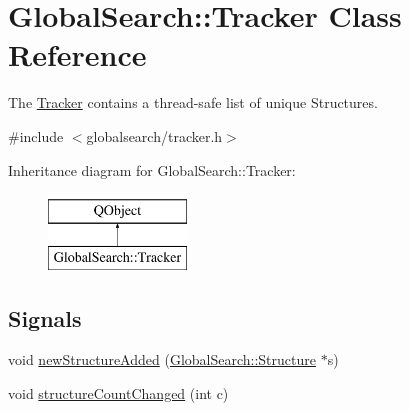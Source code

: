 \hypertarget{classGlobalSearch_1_1Tracker}{}\section{Global\+Search\+:\+:Tracker Class Reference}
\label{classGlobalSearch_1_1Tracker}


The \hyperlink{classGlobalSearch_1_1Tracker}{Tracker} contains a thread-\/safe list of unique Structures.  




{\ttfamily \#include $<$globalsearch/tracker.\+h$>$}

Inheritance diagram for Global\+Search\+:\+:Tracker\+:\begin{figure}[H]
\begin{center}
\leavevmode
\includegraphics[height=2.000000cm]{classGlobalSearch_1_1Tracker}
\end{center}
\end{figure}
\subsection*{Signals}
\begin{DoxyCompactItemize}
\item 
void \hyperlink{classGlobalSearch_1_1Tracker_ab52b21fb3c4af98fe959bb904f6d029d}{new\+Structure\+Added} (\hyperlink{classGlobalSearch_1_1Structure}{Global\+Search\+::\+Structure} $\ast$s)
\item 
void \hyperlink{classGlobalSearch_1_1Tracker_aa678a5cf9b95b57c51ae19dd6a116613}{structure\+Count\+Changed} (int c)
\end{DoxyCompactItemize}
